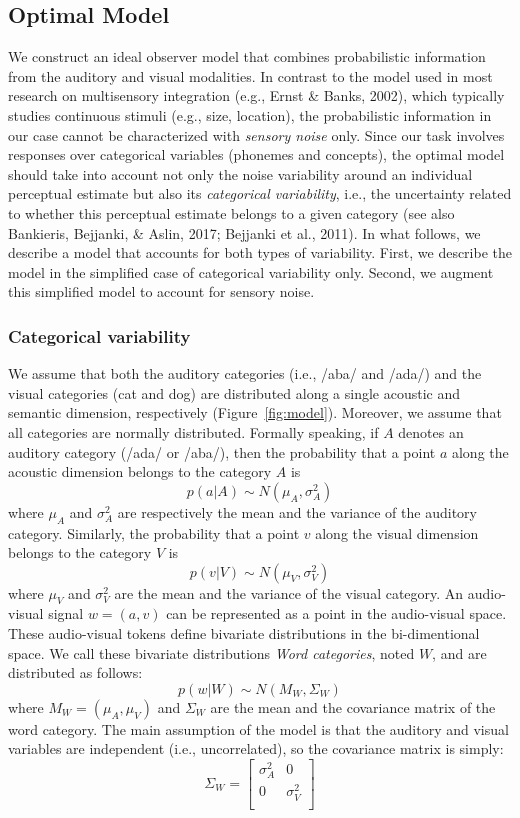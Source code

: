 \documentclass[english,floatsintext,man]{apa6}
\theoremstyle{definition}
\theoremstyle{definition}
\theoremstyle{definition}
\theoremstyle{remark}
\begin{document}
\subsection{Optimal Model}\label{optimal-model}

We construct an ideal observer model that combines probabilistic
information from the auditory and visual modalities. In contrast to the
model used in most research on multisensory integration (e.g., Ernst \&
Banks, 2002), which typically studies continuous stimuli (e.g., size,
location), the probabilistic information in our case cannot be
characterized with \emph{sensory noise} only. Since our task involves
responses over categorical variables (phonemes and concepts), the
optimal model should take into account not only the noise variability
around an individual perceptual estimate but also its \emph{categorical
variability}, i.e., the uncertainty related to whether this perceptual
estimate belongs to a given category (see also Bankieris, Bejjanki, \&
Aslin, 2017; Bejjanki et al., 2011). In what follows, we describe a
model that accounts for both types of variability. First, we describe
the model in the simplified case of categorical variability only.
Second, we augment this simplified model to account for sensory noise.

\subsubsection{Categorical variability}\label{categorical-variability}

We assume that both the auditory categories (i.e., /aba/ and /ada/) and
the visual categories (cat and dog) are distributed along a single
acoustic and semantic dimension, respectively (Figure~\ref{fig:model}).
Moreover, we assume that all categories are normally distributed.
Formally speaking, if \(A\) denotes an auditory category (/ada/ or
/aba/), then the probability that a point \(a\) along the acoustic
dimension belongs to the category \(A\) is
\[ p(a | A) \sim  N(\mu_A, \sigma^2_A) \] where \(\mu_A\) and
\(\sigma^2_A\) are respectively the mean and the variance of the
auditory category. Similarly, the probability that a point \(v\) along
the visual dimension belongs to the category \(V\) is
\[ p(v | V) \sim  N(\mu_V, \sigma^2_V) \] where \(\mu_V\) and
\(\sigma^2_V\) are the mean and the variance of the visual category. An
audio-visual signal \(w=(a,v)\) can be represented as a point in the
audio-visual space. These audio-visual tokens define bivariate
distributions in the bi-dimentional space. We call these bivariate
distributions \emph{Word categories}, noted \(W\), and are distributed
as follows: \[ p(w | W) \sim  N(M_W, \Sigma_W) \] where
\(M_W=(\mu_A, \mu_V)\) and \(\Sigma_W\) are the mean and the covariance
matrix of the word category. The main assumption of the model is that
the auditory and visual variables are independent (i.e., uncorrelated),
so the covariance matrix is simply: \[
   \Sigma_W=
  \left[ {\begin{array}{cc}
   \sigma^2_A & 0 \\
   0 & \sigma^2_V \\
  \end{array} } \right]
\]
\end{document}

